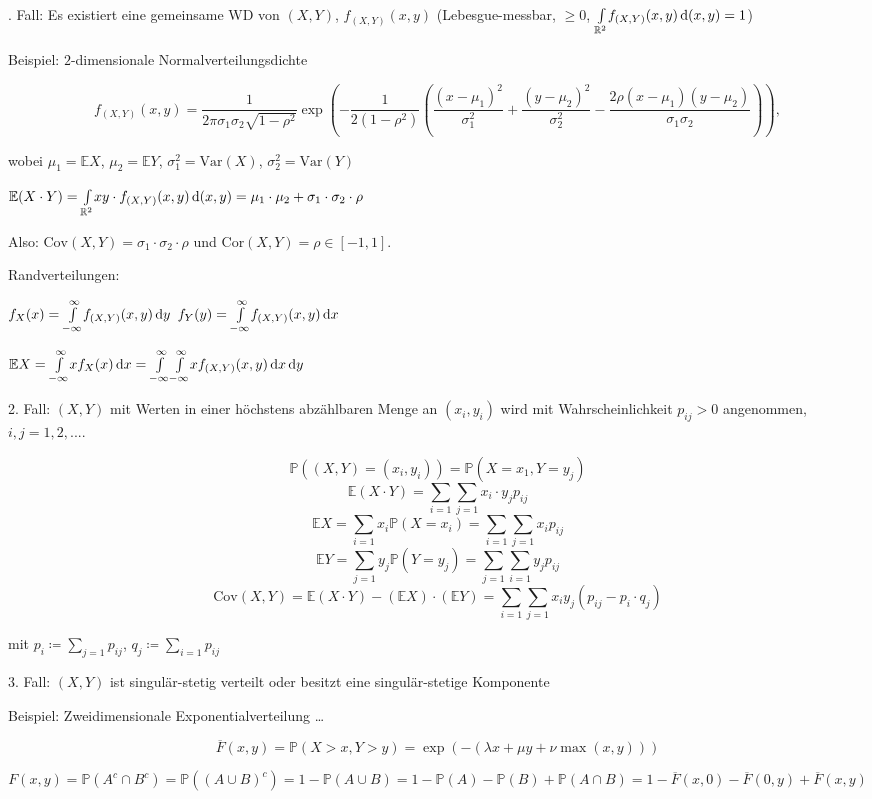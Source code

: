 \documentclass{cheat-sheet}
\renewcommand{\P}{\mathbb{P}} %
\newcommand{\E}{\mathbb{E}} %
\newcommand{\Var}{\mathrm{Var}} %
\newcommand{\Cov}{\mathrm{Cov}} %
\newcommand{\cor}{\mathrm{Cor}} %
\begin{document}
. Fall: Es existiert eine gemeinsame WD von $(X, Y)$, $f_{(X, Y)}(x, y)$ (Lebesgue-messbar, $\geq 0$, ${\textstyle \int\limits_{\mathbb{R}^2}^{}} f_{(X,Y)}(x,y) \,\mathrm{d} (x, y) = 1$)

  Beispiel: $2$-dimensionale Normalverteilungsdichte

  \[ f_{(X,Y)}(x,y) = \frac{1}{2 \pi \sigma_1 \sigma_2 \sqrt{1 - \rho^2}} \exp \left( - \frac{1}{2 (1 - \rho^2)} \left( \frac{(x-\mu_1)^2}{\sigma_1^2} + \frac{(y-\mu_2)^2}{\sigma_2^2} - \frac{2 \rho (x-\mu_1)(y-\mu_2)}{\sigma_1 \sigma_2} \right) \right), \]

  wobei $\mu_1 = \E X$, $\mu_2 = \E Y$, $\sigma_1^2 = \Var(X)$, $\sigma_2^2 = \Var(Y)$

  $\E (X \cdot Y) = \Int{\R^2}{}{x y \cdot f_{(X,Y)}(x,y)}{(x, y)} = \mu_1 \cdot \mu_2 + \sigma_1 \cdot \sigma_2 \cdot \rho$

  Also: $\Cov(X, Y) = \sigma_1 \cdot \sigma_2 \cdot \rho$ und $\cor(X, Y) = \rho \in [-1, 1]$.

  Randverteilungen:

  $f_X(x) = {\textstyle \int\limits_{-\infty}^{\infty}} f_{(X,Y)}(x,y) \,\mathrm{d} y$
  $f_Y(y) = {\textstyle \int\limits_{-\infty}^{\infty}} f_{(X,Y)}(x,y) \,\mathrm{d} x$

  $\E X = \Int{-\infty}{\infty}{x f_X(x)}{x} = \Int{-\infty}{\infty}{\Int{-\infty}{\infty}{x f_{(X,Y)}(x,y)}{x}}{y}$

  2. Fall: $(X, Y)$ mit Werten in einer höchstens abzählbaren Menge an $(x_i, y_i)$ wird mit Wahrscheinlichkeit $p_{ij} > 0$ angenommen, $i, j = 1, 2, ...$.

  \[ \P((X, Y) = (x_i, y_i)) = \P(X=x_1, Y=y_j) \]
  \[ \E(X \cdot Y) = \sum_{i=1} \sum_{j=1} x_i \cdot y_j p_{ij} \]
  \[ \E X = \sum_{i=1} x_i \P(X = x_i) = \sum_{i=1} \sum_{j=1} x_i p_{ij} \]
  \[ \E Y = \sum_{j=1} y_j \P(Y = y_j) = \sum_{j=1} \sum_{i=1} y_j p_{ij} \]
  \[ \Cov(X, Y) = \E (X \cdot Y) - (\E X) \cdot (\E Y) = \sum_{i=1} \sum_{j=1} x_i y_j (p_{ij} - p_i \cdot q_j) \]

  mit $p_i \coloneqq \sum_{j=1} p_{ij}$, $q_j \coloneqq \sum_{i=1} p_{ij}$

  3. Fall: $(X, Y)$ ist singulär-stetig verteilt oder besitzt eine singulär-stetige Komponente

  Beispiel: Zweidimensionale Exponentialverteilung \ldots

  \[ \overline{F}(x,y) = \P(X > x, Y > y) = \exp \left( -(\lambda x + \mu y + \nu \max(x,y)) \right) \]

  \[ F(x, y) = \P(A^c \cap B^c) = \P((A \cup B)^c) = 1 - \P(A \cup B) = 1 - \P(A) - \P(B) + \P(A \cap B) = 1 - \overline{F}(x,0) - \overline{F}(0,y) + \overline{F}(x,y) \]
\end{document}
